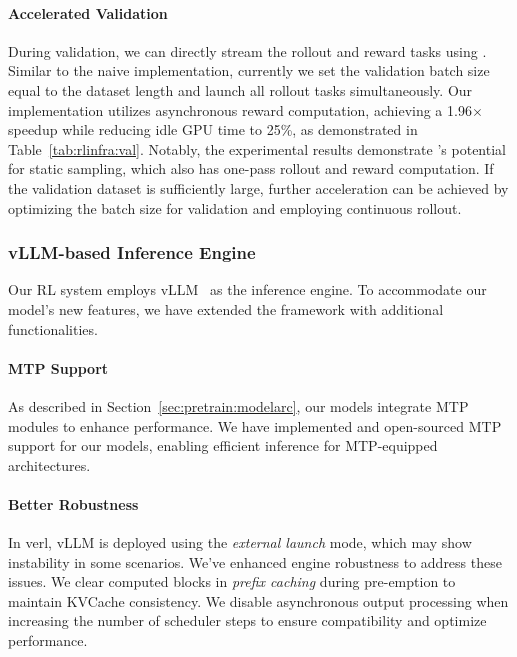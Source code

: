 \paragraph{Accelerated Validation}
%
During validation, we can directly stream the rollout and reward tasks using \rlsys{}.
%
Similar to the naive implementation, currently we set the validation batch size equal to the dataset length and launch all rollout tasks simultaneously.
%
Our implementation utilizes asynchronous reward computation, achieving a 1.96$\times$ speedup while reducing idle GPU time to 25\%, as demonstrated in Table~\ref{tab:rlinfra:val}.
%
Notably, the experimental results demonstrate \rlsys{}'s potential for static sampling, which also has one-pass rollout and reward computation.
%
If the validation dataset is sufficiently large, further acceleration can be achieved by optimizing the batch size for validation and employing continuous rollout.




\subsubsection{vLLM-based Inference Engine}

Our RL system employs vLLM~\citep{kwon2023efficient} as the inference engine. 
%
To accommodate our model's new features, we have extended the framework with additional functionalities.

\paragraph{MTP Support}
%
As described in Section~\ref{sec:pretrain:modelarc}, our models integrate MTP modules to enhance performance. 
%
We have implemented and open-sourced MTP support for our models, enabling efficient inference for MTP-equipped architectures.


\paragraph{Better Robustness}
%
In verl, vLLM is deployed using the \textit{external launch} mode, which may show instability in some scenarios.
%
We've enhanced engine robustness to address these issues.
%
We clear computed blocks in \textit{prefix caching} during pre-emption to maintain KVCache consistency.
%
We disable asynchronous output processing when increasing the number of scheduler steps to ensure compatibility and optimize performance.
